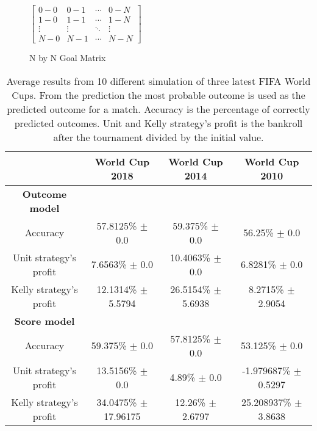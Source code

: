 

\begin{figure}
    $\begin{bmatrix}
    0-0 & 0-1 & \cdots & 0-N \\
    1-0 & 1-1 & \cdots   &1-N \\
    \vdots & \vdots   & \ddots & \vdots \\
    N-0 & N-1 & \cdots & N-N\end{bmatrix}$
\caption{N by N Goal Matrix}
\end{figure}

\begin{sidewaystable}
    \caption{Average results from 10 different simulation of three latest FIFA World Cups. From the prediction the most probable outcome is used as the predicted outcome for a match. Accuracy is the percentage of correctly predicted outcomes. Unit and Kelly strategy's profit is the bankroll after the tournament divided by the initial value.}
    \begin{tabular}{ | c |c| c | c |}
    \hline
    & World Cup 2018 & World Cup 2014 & World Cup 2010 \\
    \hline
    \textbf{Outcome model} \\
    \hline
    Accuracy & 57.8125\% $\pm$ 0.0 & 59.375\% $\pm$  0.0 & 56.25\% $\pm$ 0.0 \\
    Unit strategy's profit& 7.6563\% $\pm$ 0.0 & 10.4063\% $\pm$ 0.0 & 6.8281\% $\pm$ 0.0 \\
    Kelly strategy's profit& 12.1314\% $\pm$ 5.5794 & 26.5154\% $\pm$ 5.6938 & 8.2715\% $\pm$ 2.9054 \\
    \hline
    \textbf{Score model} \\
    \hline
    Accuracy & 59.375\% $\pm$ 0.0 & 57.8125\% $\pm$ 0.0 & 53.125\% $\pm$ 0.0 \\
    Unit strategy's profit & 13.5156\% $\pm$ 0.0 & 4.89\%  $\pm$ 0.0 & -1.979687\% $\pm$ 0.5297 \\
    Kelly strategy's profit & 34.0475\% $\pm$ 17.96175 & 12.26\% $\pm$ 2.6797 & 25.208937\% $\pm$ 3.8638 \\
    \hline
   \end{tabular}
\end{sidewaystable}


